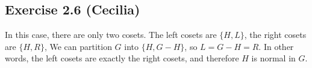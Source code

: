 \subsection*{Exercise 2.6 (Cecilia)}

In this case, there are only two cosets. The left cosets are $ \{H , L \}$, the right cosets are $ \{H, R\}$, We can partition $ G $ into $ \{H, G - H\} $, so $ L = G - H = R $. In other words, the left cosets are exactly the right cosets, and therefore $ H $ is normal in $ G $.